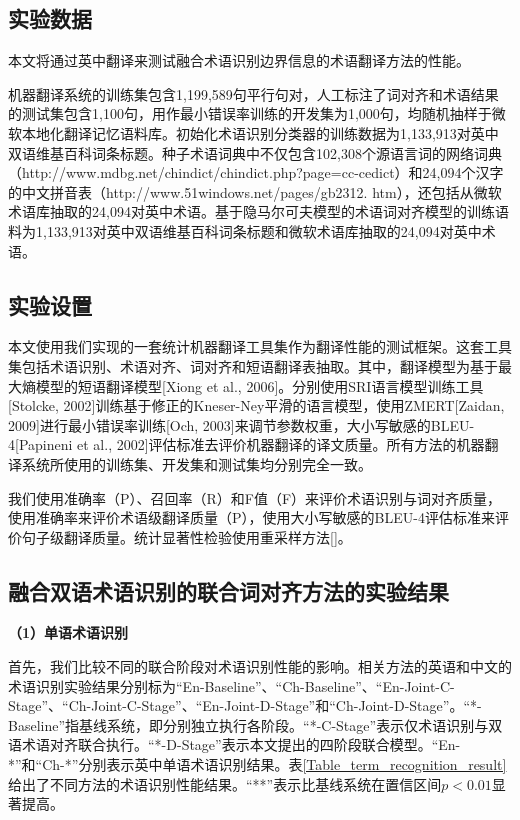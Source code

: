\subsection{实验数据}

本文将通过英中翻译来测试融合术语识别边界信息的术语翻译方法的性能。

机器翻译系统的训练集包含1,199,589句平行句对，人工标注了词对齐和术语结果的测试集包含1,100句，用作最小错误率训练的开发集为1,000句，均随机抽样于微软本地化翻译记忆语料库。初始化术语识别分类器的训练数据为1,133,913对英中双语维基百科词条标题。种子术语词典中不仅包含102,308个源语言词的网络词典（http://www.mdbg.net/chindict/chindict.php?page=cc-cedict）和24,094个汉字的中文拼音表（http://www.51windows.net/pages/gb2312. htm），还包括从微软术语库抽取的24,094对英中术语。基于隐马尔可夫模型的术语词对齐模型的训练语料为1,133,913对英中双语维基百科词条标题和微软术语库抽取的24,094对英中术语。

\subsection{实验设置}

本文使用我们实现的一套统计机器翻译工具集作为翻译性能的测试框架。这套工具集包括术语识别、术语对齐、词对齐和短语翻译表抽取。其中，翻译模型为基于最大熵模型的短语翻译模型[Xiong et al., 2006]。分别使用SRI语言模型训练工具[Stolcke, 2002]训练基于修正的Kneser-Ney平滑的语言模型，使用ZMERT[Zaidan, 2009]进行最小错误率训练[Och, 2003]来调节参数权重，大小写敏感的BLEU-4[Papineni et al., 2002]评估标准去评价机器翻译的译文质量。所有方法的机器翻译系统所使用的训练集、开发集和测试集均分别完全一致。

我们使用准确率（P）、召回率（R）和F值（F）来评价术语识别与词对齐质量，使用准确率来评价术语级翻译质量（P），使用大小写敏感的BLEU-4评估标准来评价句子级翻译质量。统计显著性检验使用重采样方法[\cite{Koehn:2004b}]。

\subsection{融合双语术语识别的联合词对齐方法的实验结果}

\textbf{（1）单语术语识别}

首先，我们比较不同的联合阶段对术语识别性能的影响。相关方法的英语和中文的术语识别实验结果分别标为“En-Baseline”、“Ch-Baseline”、“En-Joint-C-Stage”、“Ch-Joint-C-Stage”、“En-Joint-D-Stage”和“Ch-Joint-D-Stage”。“*-Baseline”指基线系统，即分别独立执行各阶段。“*-C-Stage”表示仅术语识别与双语术语对齐联合执行。“*-D-Stage”表示本文提出的四阶段联合模型。“En-*”和“Ch-*”分别表示英中单语术语识别结果。表\ref{Table_term_recognition_result}给出了不同方法的术语识别性能结果。“**”表示比基线系统在置信区间$p<0.01$显著提高。

